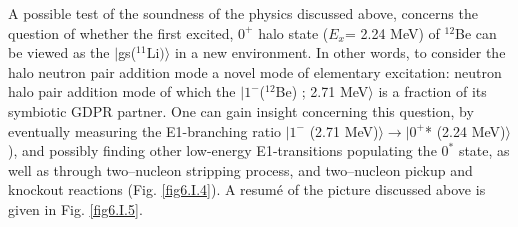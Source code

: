 \begin{subappendices}
A  possible test of the soundness of the physics  discussed above, concerns the question of whether the first excited, 
$0^+$ halo state ($E_x$= 2.24 MeV) of $^{12}$Be can be viewed as the $|$gs($^{11}$Li$)\rangle$ in a new environment. In other words, 
to consider the halo neutron pair addition mode
 a novel mode of  elementary excitation: neutron halo pair  addition mode of which the $|1^- $($^{12}$Be) ; 2.71 MeV$\rangle $ is 
 a fraction of  its symbiotic  GDPR partner. One can gain insight concerning this question, by 
 eventually measuring the E1-branching ratio $|1^-$ (2.71 MeV)$\rangle  \to |0^+$* (2.24 MeV)$\rangle$ ), and possibly 
 finding other low-energy E1-transitions populating the $0^*$ state, as well as through  two--nucleon stripping process,
 and two--nucleon pickup and knockout reactions (Fig. \ref{fig6.I.4}).
 A resum\'e of the picture discussed above is given   in Fig. \ref{fig6.I.5}.






\end{subappendices}
\renewcommand{\bibname}{Bibliography Ch 6}

%
 